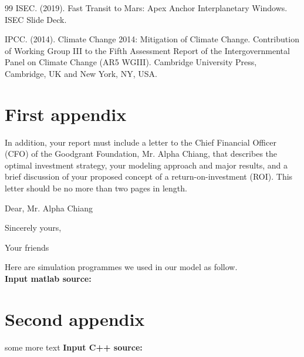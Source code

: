 \documentclass{mcmthesis}
\begin{document}
\begin{enumerate}
\begin{thebibliography}{99}
		ISEC. (2019). Fast Transit to Mars: Apex Anchor Interplanetary Windows.
		ISEC Slide Deck.
		
		IPCC. (2014). Climate Change 2014: Mitigation of Climate Change.
		Contribution of Working Group III to the Fifth Assessment Report of the
		Intergovernmental Panel on Climate Change (AR5 WGIII). Cambridge University
		Press, Cambridge, UK and New York, NY, USA.
	\end{thebibliography}
	\begin{appendices}
		
		\section{First appendix}
		
		In addition, your report must include a letter to the Chief Financial Officer (CFO) of the Goodgrant Foundation, Mr. Alpha Chiang, that describes the optimal investment strategy, your modeling approach and major results, and a brief discussion of your proposed concept of a return-on-investment (ROI). This letter should be no more than two pages in length.
		
		\begin{letter}{Dear, Mr. Alpha Chiang}
			
			\lipsum[1-2]
			
			\vspace{\parskip}
			
			Sincerely yours,
			
			Your friends
			
		\end{letter}
		Here are simulation programmes we used in our model as follow.\\
		
		\textbf{\textcolor[rgb]{0.98,0.00,0.00}{Input matlab source:}}
		
		\section{Second appendix}
		
		some more text \textcolor[rgb]{0.98,0.00,0.00}{\textbf{Input C++ source:}}
		

\end{appendices}
\end{enumerate}
\end{document}
